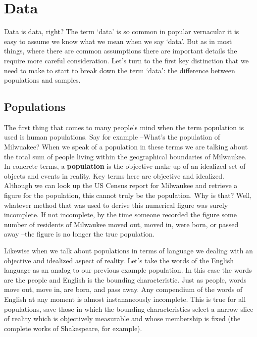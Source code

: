 \documentclass[
  letterpaper,
]{latex/krantz}
\begin{document}
\hypertarget{data}{%
\section{Data}\label{data}}

Data is data, right? The term `data' is so common in popular vernacular
it is easy to assume we know what we mean when we say `data'. But as in
most things, where there are common assumptions there are important
details the require more careful consideration. Let's turn to the first
key distinction that we need to make to start to break down the term
`data': the difference between populations and samples.

\hypertarget{populations}{%
\subsection{Populations}\label{populations}}

The first thing that comes to many people's mind when the term
population is used is human populations. Say for example --What's the
population of Milwuakee? When we speak of a population in these terms we
are talking about the total sum of people living within the geographical
boundaries of Milwaukee. In concrete terms, a
\textbf{population} is the objective make up of an
idealized set of objects and events in reality. Key terms here are
objective and idealized. Although we can look up the US Census report
for Milwaukee and retrieve a figure for the population, this cannot
truly be the population. Why is that? Well, whatever method that was
used to derive this numerical figure was surely incomplete. If not
incomplete, by the time someone recorded the figure some number of
residents of Milwaukee moved out, moved in, were born, or passed away
--the figure is no longer the true population.

Likewise when we talk about populations in terms of language we dealing
with an objective and idealized aspect of reality. Let's take the words
of the English language as an analog to our previous example population.
In this case the words are the people and English is the bounding
characteristic. Just as people, words move out, move in, are born, and
pass away. Any compendium of the words of English at any moment is
almost instananeously incomplete. This is true for all populations, save
those in which the bounding characteristics select a narrow slice of
reality which is objectively measurable and whose membership is fixed
(the complete works of Shakespeare, for example).
\end{document}
